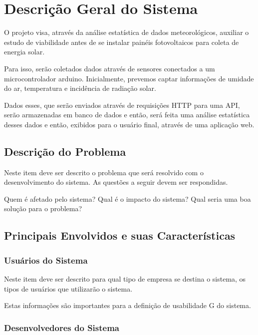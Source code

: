 \chapter{Descrição Geral do Sistema}


O projeto visa, através da análise estatística de dados meteorológicos, auxiliar o estudo de viabilidade antes de se instalar painéis fotovoltaicos para coleta de energia solar.

Para isso, serão coletados dados através de sensores conectados a um microcontrolador arduino. Inicialmente, prevemos captar informações de umidade do ar, temperatura e incidência de radiação solar.

Dados esses, que serão enviados através de requisições HTTP para uma API, serão armazenadas em banco de dados e então, será feita uma análise estatística desses dados e então, exibidos para o usuário final, através de uma aplicação web.

\section{Descrição do Problema}

Neste item deve ser descrito o problema que será resolvido com o desenvolvimento do sistema. As questões a seguir devem ser respondidas.

Quem é afetado pelo sistema?
Qual é o impacto do sistema?
Qual seria uma boa solução para o problema?

\section{Principais Envolvidos e suas Características}

\subsection{Usuários do Sistema}

Neste item deve ser descrito para qual tipo de empresa se destina o sistema, os tipos de usuários que utilizarão o sistema.

Estas informações são importantes para a definição de usabilidade G do sistema.

\subsection{Desenvolvedores do Sistema}

